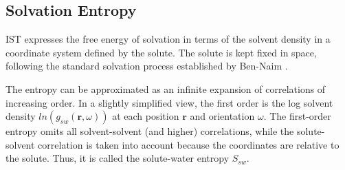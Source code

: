 \documentclass[9pt,tutorial]{livecoms}
\begin{document}
\subsection{Solvation Entropy}


IST expresses the free energy of solvation in terms of the solvent density in a coordinate system defined by the solute.
The solute is kept fixed in space, following the standard solvation process established by Ben-Naim \cite{ben-naim-book}.

The entropy can be approximated as an infinite expansion of correlations of increasing order.
In a slightly simplified view, the first order is the log solvent density $ln\left(g_\textit{sw}\left(\textbf{r},\omega \right)\right)$ at each position $\textbf{r}$ and orientation $\omega$.
The first-order entropy omits all solvent-solvent (and higher) correlations, while the solute-solvent correlation is taken into account because the coordinates are relative to the solute.
Thus, it is called the solute-water entropy $S_{sw}$.
\end{document}
